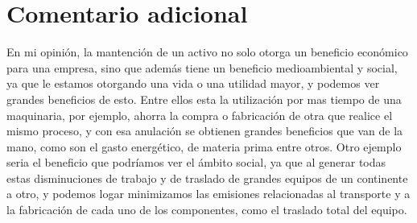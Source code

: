 \documentclass[]{article}
\begin{document}
\hypertarget{comentario-adicional}{%
\section{Comentario adicional}
\label{comentario-adicional}}
En mi opinión, la mantención de un activo no solo otorga un beneficio económico para una empresa, sino que además tiene un beneficio medioambiental y social, ya que le estamos otorgando una vida o una utilidad mayor, y podemos ver grandes beneficios de esto. Entre ellos esta la utilización por mas tiempo de una maquinaria, por ejemplo, ahorra la compra o fabricación de otra que realice el mismo proceso, y con esa anulación se obtienen grandes beneficios que van de la mano, como son el gasto energético, de materia prima entre otros. Otro ejemplo seria el  beneficio que podríamos ver el ámbito social, ya que al generar todas estas disminuciones de trabajo y de traslado de grandes equipos de un continente a otro, y podemos logar  minimizamos las emisiones relacionadas al transporte y a la fabricación de cada uno de los componentes, como el traslado total del equipo.








\end{document}
